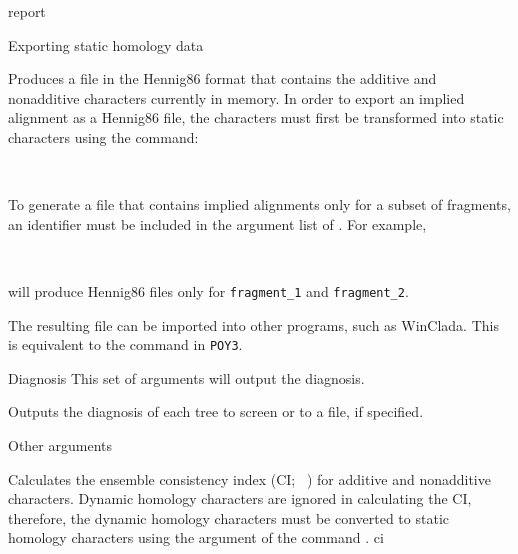 \begin{command}{report}{}
\begin{arguments}
\begin{argumentgroup}{Exporting static homology data}
                {Produces a file in the Hennig86 format that contains the
                additive and nonadditive characters currently in memory.  In
                order to export an implied alignment as a Hennig86 file, the
                characters must first be transformed into static characters
                using the  command: 
                \begin{flushleft}
                     \\
                \end{flushleft} 
                To generate a file that contains implied
                alignments only for a subset of fragments, an identifier must be
                included in the argument list of . For
                example, 
                \begin{flushleft}
                 \\
                \end{flushleft}
                will produce Hennig86 files only for
                \texttt{fragment\_1} and \texttt {fragment\_2}.
                
                The resulting file can be imported into other programs,
                such as WinClada.  This is equivalent to the
                 command in \texttt{POY3}.}
                {}

		\end{argumentgroup}

		\begin{argumentgroup}{Diagnosis}
			{This set of arguments will output the diagnosis.} 

                {Outputs the diagnosis of each tree to screen or to a file, if
                specified.} 
                {}

		\end{argumentgroup} 

		\begin{argumentgroup}{Other arguments}
			{} 

	      {Calculates the ensemble consistency index (CI; ~\cite{farris1989,
	      klugeandfarris1969,}) for additive and nonadditive
	      characters. Dynamic homology characters are ignored in calculating
	      the CI, therefore, the dynamic homology characters must be converted
	      to static homology characters using the argument  
	      of the command .}
	      {ci}
	      

\end{argumentgroup}
\end{arguments}
\end{command}
